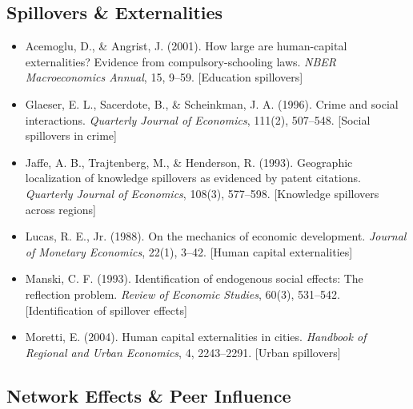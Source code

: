 \subsection*{Spillovers \& Externalities}

\begin{itemize}

\item Acemoglu, D., \& Angrist, J. (2001). 
How large are human-capital externalities? Evidence from compulsory-schooling laws. 
\textit{NBER Macroeconomics Annual}, 15, 9--59.
[Education spillovers]

\item Glaeser, E. L., Sacerdote, B., \& Scheinkman, J. A. (1996). 
Crime and social interactions. 
\textit{Quarterly Journal of Economics}, 111(2), 507--548.
[Social spillovers in crime]

\item Jaffe, A. B., Trajtenberg, M., \& Henderson, R. (1993). 
Geographic localization of knowledge spillovers as evidenced by patent citations. 
\textit{Quarterly Journal of Economics}, 108(3), 577--598.
[Knowledge spillovers across regions]

\item Lucas, R. E., Jr. (1988). 
On the mechanics of economic development. 
\textit{Journal of Monetary Economics}, 22(1), 3--42.
[Human capital externalities]

\item Manski, C. F. (1993). 
Identification of endogenous social effects: The reflection problem. 
\textit{Review of Economic Studies}, 60(3), 531--542.
[Identification of spillover effects]

\item Moretti, E. (2004). 
Human capital externalities in cities. 
\textit{Handbook of Regional and Urban Economics}, 4, 2243--2291.
[Urban spillovers]

\end{itemize}

\subsection*{Network Effects \& Peer Influence}

